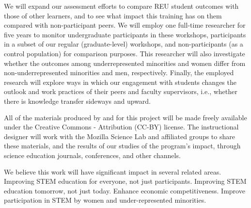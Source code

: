\documentclass[11pt]{article}
\begin{document}
We will expand our assessment efforts to compare REU student outcomes
with those of other learners, and to see what impact this training has
on them compared with non-participant peers.  We
will employ one full-time researcher for five years to monitor
undergraduate participants in these workshops, participants in a
subset of our regular (graduate-level) workshops, and non-participants
(as a control population) for comparison purposes.  This researcher
will also investigate whether the outcomes among
underrepresented minorities and women differ from non-underrepresented minorities and men, respectively. Finally, the employed research will explore ways in which our engagement with students changes
the outlook and work practices of their peers and faculty supervisors,
i.e., whether there is knowledge transfer sideways and upward. 

All of the materials produced by and for this project will be made
freely available under the Creative Commons - Attribution (CC-BY)
license.  The instructional designer will work with the Mozilla
Science Lab and affiliated groups to share these materials, and the
results of our studies of the program's impact, through science
education journals, conferences, and other channels.

We believe this work will have significant impact in several related
areas. Improving STEM education for everyone, not just participants. Improving STEM education tomorrow, not just today. Enhance economic competitiveness. Improve participation in STEM by women and under-represented minorities.
\end{document}
